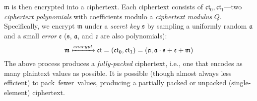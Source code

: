 $\mathfrak{m}$ is then encrypted into a ciphertext. Each ciphertext consists of
$\mathfrak{ct}_0, \mathfrak{ct}_1$---two \emph{ciphertext polynomials}
with coefficients modulo a \emph{ciphertext modulus} $Q$.
Specifically, we encrypt $\mathfrak{m}$
under a \emph{secret key} $\mathfrak{s}$
by sampling a uniformly random $\mathfrak{a}$
and a small \emph{error} $\mathfrak{e}$ ($\mathfrak{s}$, $\mathfrak{a}$, and $\mathfrak{e}$ are also polynomials):
\begin{equation*}
    \mathfrak{m} \xmapsto{encrypt} \mathfrak{ct} = (\mathfrak{ct}_0, \mathfrak{ct}_1) = (\mathfrak{a}, \mathfrak{a}\cdot\mathfrak{s}+\mathfrak{e}+\mathfrak{m})
\end{equation*}
The above process produces a \emph{fully-packed} ciphertext, i.e., one
that encodes as many plaintext values as possible. It is possible
(though almost always less efficient) to pack~fewer~values,
producing a partially packed or unpacked (single-element) ciphertext.



